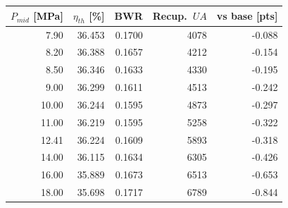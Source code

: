 \begin{tabular}{@{}rrrrr@{}}
\toprule
$P_{mid}$ [MPa] & $\eta_{th}$ [\%] & BWR & Recup.\ $UA$ & vs base [pts] \\
\midrule
7.90 & 36.453 & 0.1700 & 4078 & -0.088 \\
8.20 & 36.388 & 0.1657 & 4212 & -0.154 \\
8.50 & 36.346 & 0.1633 & 4330 & -0.195 \\
9.00 & 36.299 & 0.1611 & 4513 & -0.242 \\
10.00 & 36.244 & 0.1595 & 4873 & -0.297 \\
11.00 & 36.219 & 0.1595 & 5258 & -0.322 \\
12.41 & 36.224 & 0.1609 & 5893 & -0.318 \\
14.00 & 36.115 & 0.1634 & 6305 & -0.426 \\
16.00 & 35.889 & 0.1673 & 6513 & -0.653 \\
18.00 & 35.698 & 0.1717 & 6789 & -0.844 \\
\bottomrule
\end{tabular}
